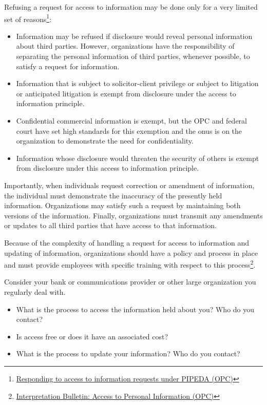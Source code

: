 Refusing a request for access to information may be done only for a very limited set of reasons\footnote{\href{https://www.priv.gc.ca/en/privacy-topics/accessing-personal-information/obligations-for-organizations/02_05_d_54_ati_02/}{Responding to access to information requests under PIPEDA (OPC)}}:

\begin{itemize}
   \item Information may be refused if disclosure would reveal personal information about third parties. However, organizations have the responsibility of separating the personal information of third parties, whenever possible, to satisfy a request for information. 
   \item Information that is subject to solicitor-client privilege or subject to litigation or anticipated litigation is exempt from disclosure under the access to information principle.
   \item Confidential commercial information is exempt, but the OPC and federal court have set high standards for this exemption and the onus is on the organization to demonstrate the need for confidentiality.
   \item Information whose disclosure would threaten the security of others is exempt from disclosure under this access to information principle.
\end{itemize}

Importantly, when individuals request correction or amendment of information, the individual must demonstrate the inaccuracy of the presently held information. Organizations may satisfy such a request by maintaining both versions of the information. Finally, organizations must transmit any amendments or updates to all third parties that have access to that information. 

Because of the complexity of handling a request for access to information and updating of information, organizations should have a policy and process in place and must provide employees with specific training with respect to this process\footnote{\href{https://www.priv.gc.ca/en/privacy-topics/privacy-laws-in-canada/the-personal-information-protection-and-electronic-documents-act-pipeda/pipeda-compliance-help/pipeda-interpretation-bulletins/interpretations_05_access/}{Interpretation Bulletin: Access to Personal Information (OPC)}}. 

\begin{exercisebox}

Consider your bank or communications provider or other large organization you regularly deal with. 
\begin{itemize}
  \item What is the process to access the information held about you? Who do you contact?
  \item Is access free or does it have an associated cost?
  \item What is the process to update your information? Who do you contact?
\end{itemize}
\end{exercisebox}

